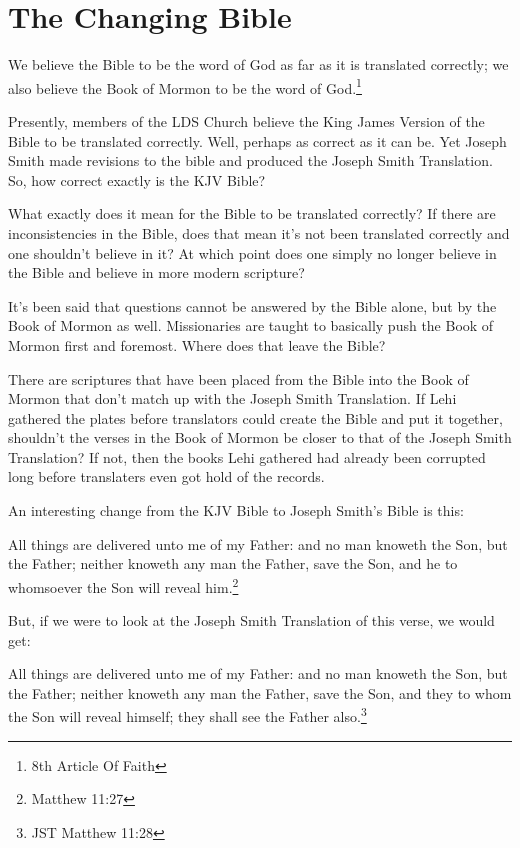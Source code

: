 \chapter{The Changing Bible}

\begin{displayquote}
We believe the Bible to be the word of God as far as it is translated correctly; 
we also believe the Book of Mormon to be the word of 
God.\footnote{8th Article Of Faith}
\end{displayquote}

Presently, members of the LDS Church believe the King James Version of the Bible to
be translated correctly. Well, perhaps as correct as it can be. Yet Joseph Smith made
revisions to the bible and produced the Joseph Smith Translation. So, how correct
exactly is the KJV Bible?

What exactly does it mean for the Bible to be translated correctly? If there are
inconsistencies in the Bible, does that mean it's not been translated correctly and
one shouldn't believe in it? At which point does one simply no longer believe in the
Bible and believe in more modern scripture?

It's been said that questions cannot be answered by the Bible alone, but by the Book
of Mormon as well. Missionaries are taught to basically push the Book of Mormon first
and foremost. Where does that leave the Bible?

There are scriptures that have been placed from the Bible into the Book of Mormon
that don't match up with the Joseph Smith Translation. If Lehi gathered the plates
before translators could create the Bible and put it together, shouldn't the verses
in the Book of Mormon be closer to that of the Joseph Smith Translation? If not, then
the books Lehi gathered had already been corrupted long before translaters even got
hold of the records.

An interesting change from the KJV Bible to Joseph Smith's Bible is this:

\begin{displayquote}
All things are delivered unto me of my Father: and no man knoweth the Son, but the 
Father; neither knoweth any man the Father, save the Son, and he to whomsoever the 
Son will reveal him.\footnote{Matthew 11:27}
\end{displayquote}

But, if we were to look at the Joseph Smith Translation of this verse, we would get:

\begin{displayquote}
All things are delivered unto me of my Father: and no man knoweth the Son, but the 
Father; neither knoweth any man the Father, save the Son, and they to whom the 
Son will reveal himself; they shall see the Father also.\footnote{JST Matthew 11:28}
\end{displayquote}

